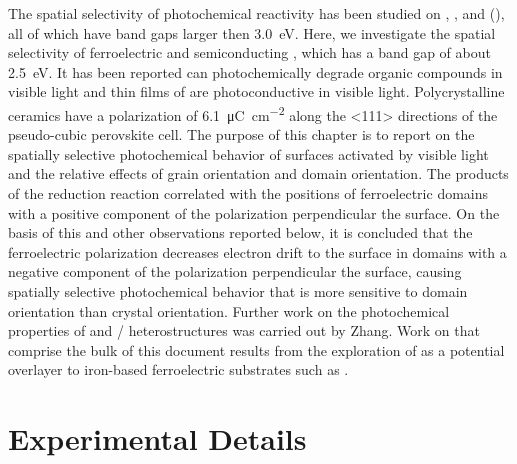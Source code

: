 The spatial selectivity of photochemical reactivity has been studied on
,\cite{Giocondi:2001gz,Burbure:2010go,Burbure:2010ti,Bhardwaj:2010eh}
,\cite{Hanson:2006bq} and 
(),\cite{Kalinin:2002iw,Tiwari:2009jv} all of which have band gaps larger then
\SI{3.0}{\electronvolt}. Here, we investigate the spatial selectivity of ferroelectric and
semiconducting , which has a band gap of about
\SI{2.5}{\electronvolt}.\cite{Basu:2008hd,Choi:2009gh,Gao:2006fg} It has been reported
 can photochemically degrade organic compounds in visible
light\cite{Cho:2008ki,Gao:2007eb} and thin films of  are photoconductive in
visible light.\cite{Basu:2008hd} Polycrystalline  ceramics have a polarization
of \SI{6.1}{\micro\coulomb\per\centi\meter\squared} along the <111> directions of the
pseudo-cubic perovskite cell.\cite{Anonymous:2011wx} The purpose of this chapter is to
report on the spatially selective photochemical behavior of  surfaces activated
by visible light and the relative effects of grain orientation and domain orientation. The
products of the reduction reaction correlated with the positions of ferroelectric domains
with a positive component of the polarization perpendicular the  surface. On
the basis of this and other observations reported below, it is concluded that the
ferroelectric polarization decreases electron drift to the surface in domains with a
negative component of the polarization perpendicular the surface, causing spatially
selective photochemical behavior that is more sensitive to domain orientation than crystal
orientation. Further work on the photochemical properties of  and
/ heterostructures was carried out by Zhang.\cite{Zhang:2011cj} Work
on  that comprise the bulk of this document results from the exploration of
 as a potential overlayer to iron-based ferroelectric substrates such as
.


\section{Experimental Details}
\label{sec:ch7experimental}


